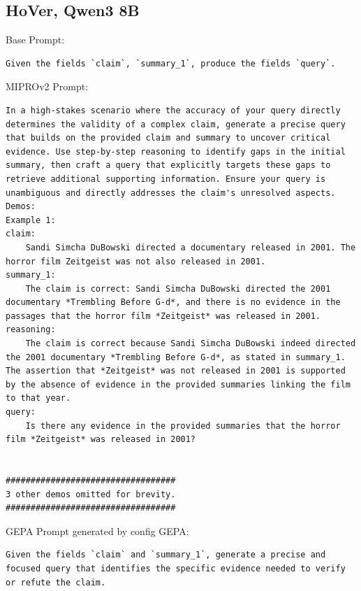 \subsection{HoVer, Qwen3 8B}
\begin{instructbox}
Base Prompt:
\begin{lstlisting}[breakindent=0pt, breaklines=true, breakatwhitespace=true, frame=single, backgroundcolor=\color{gray!10}]
Given the fields `claim`, `summary_1`, produce the fields `query`.
\end{lstlisting}

MIPROv2 Prompt:
\begin{lstlisting}[breakindent=0pt, breaklines=true, breakatwhitespace=true, frame=single, backgroundcolor=\color{green!10}]
In a high-stakes scenario where the accuracy of your query directly determines the validity of a complex claim, generate a precise query that builds on the provided claim and summary to uncover critical evidence. Use step-by-step reasoning to identify gaps in the initial summary, then craft a query that explicitly targets these gaps to retrieve additional supporting information. Ensure your query is unambiguous and directly addresses the claim's unresolved aspects.
Demos:
Example 1:
claim:
    Sandi Simcha DuBowski directed a documentary released in 2001. The horror film Zeitgeist was not also released in 2001.
summary_1:
    The claim is correct: Sandi Simcha DuBowski directed the 2001 documentary *Trembling Before G-d*, and there is no evidence in the passages that the horror film *Zeitgeist* was released in 2001.
reasoning:
    The claim is correct because Sandi Simcha DuBowski indeed directed the 2001 documentary *Trembling Before G-d*, as stated in summary_1. The assertion that *Zeitgeist* was not released in 2001 is supported by the absence of evidence in the provided summaries linking the film to that year.
query:
    Is there any evidence in the provided summaries that the horror film *Zeitgeist* was released in 2001?


##################################
3 other demos omitted for brevity.
##################################

\end{lstlisting}

GEPA Prompt generated by config GEPA:
\begin{lstlisting}[breakindent=0pt, breaklines=true, breakatwhitespace=true, frame=single, backgroundcolor=\color{blue!10}]
Given the fields `claim` and `summary_1`, generate a precise and focused query that identifies the specific evidence needed to verify or refute the claim.  


\end{lstlisting}
\end{instructbox}

